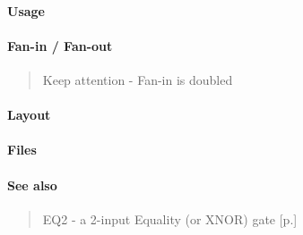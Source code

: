 \paragraph{Usage}

\paragraph{Fan-in / Fan-out}
\begin{quote}
    Keep attention - Fan-in is doubled
\end{quote}

\paragraph{Layout}

\paragraph{Files}

\paragraph{See also}
\begin{quote}
    EQ2 - a 2-input Equality (or XNOR) gate [p.\pageref{EQ2}]
\end{quote}
